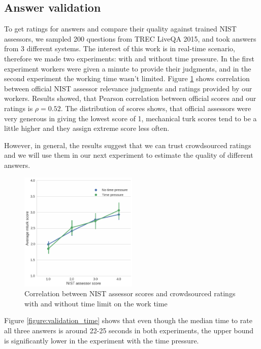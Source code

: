 \documentclass[11pt,letterpaper]{article}
\begin{document}
\subsection{Answer validation}

To get ratings for answers and compare their quality against trained NIST assessors, we sampled 200 questions from TREC LiveQA 2015, and took answers from 3 different systems.
The interest of this work is in real-time scenario, therefore we made two experiments: with and without time pressure.
In the first experiment workers were given a minute to provide their judgments, and in the second experiment the working time wasn't limited.
Figure \ref{figure:score_correlation} shows correlation between official NIST assessor relevance judgments and ratings provided by our workers.
Results showed, that Pearson correlation between official scores and our ratings is $\rho=0.52$.
The distribution of scores shows, that official assessors were very generous in giving the lowest score of 1, mechanical turk scores tend to be a little higher and they assign extreme score less often.

However, in general, the results suggest that we can trust crowdsourced ratings and we will use them in our next experiment to estimate the quality of different answers.

\begin{figure}[t!]
	\centering
	\includegraphics[width=0.5\textwidth]{img/score_correlation}
	\caption{Correlation between NIST assessor scores and crowdsourced ratings with and without time limit on the work time}
	\label{figure:score_correlation}
\end{figure}
	
Figure \ref{figure:validation_time} shows that even though the median time to rate all three answers is around 22-25 seconds in both experiments, the upper bound is significantly lower in the experiment with the time pressure.
	
\end{document}
